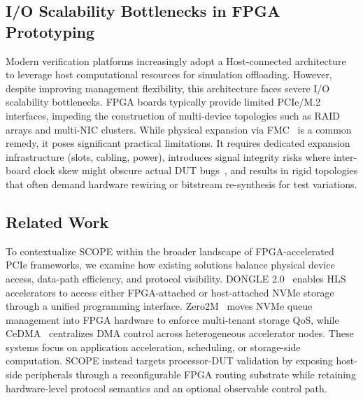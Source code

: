 \documentclass[10pt,conference,letterpaper]{IEEEtran}
\begin{document}
\subsection{I/O Scalability Bottlenecks in FPGA Prototyping}

Modern verification platforms increasingly adopt a Host-connected architecture~\cite{amos2011fpga} to leverage host computational resources for simulation offloading. However, despite improving management flexibility, this architecture faces severe I/O scalability bottlenecks. FPGA boards typically provide limited PCIe/M.2 interfaces, impeding the construction of multi-device topologies such as RAID arrays and multi-NIC clusters. While physical expansion via FMC~\cite{seelam2009design} is a common remedy, it poses significant practical limitations. It requires dedicated expansion infrastructure (slots, cabling, power), introduces signal integrity risks where inter-board clock skew might obscure actual DUT bugs~\cite{amos2011fpga}, and results in rigid topologies that often demand hardware rewiring or bitstream re-synthesis for test variations.

\subsection{Related Work}
\label{sec:related_work}

To contextualize SCOPE within the broader landscape of FPGA-accelerated PCIe frameworks, we examine how existing solutions balance physical device access, data-path efficiency, and protocol visibility. DONGLE 2.0~\cite{wong2024dongle} enables HLS accelerators to access either FPGA-attached or host-attached NVMe storage through a unified programming interface. Zero2M~\cite{wang2026zero2m} moves NVMe queue management into FPGA hardware to enforce multi-tenant storage QoS, while CeDMA~\cite{li2025cedma} centralizes DMA control across heterogeneous accelerator nodes. These systems focus on application acceleration, scheduling, or storage-side computation. SCOPE instead targets processor-DUT validation by exposing host-side peripherals through a reconfigurable FPGA routing substrate while retaining hardware-level protocol semantics and an optional observable control path.
\end{document}
